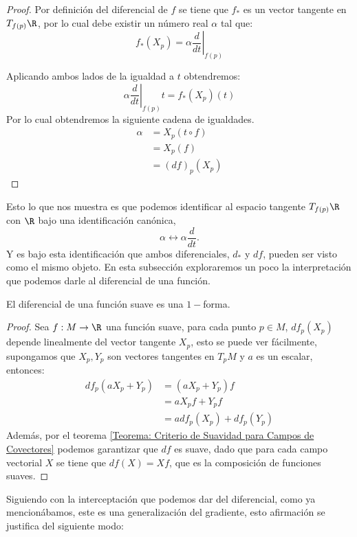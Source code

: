 \begin{proof}
	Por definición del diferencial de $f$ se tiene que $f_*$ es un vector tangente en $T_{f(p)}\R$, por lo cual debe existir un número real $\alpha$ tal que:
	\[
		f_*(X_p) = \alpha \left. \frac{d}{dt} \right|_{f(p)}
	\]

	Aplicando ambos lados de la igualdad a $t$ obtendremos:
	\[
		\alpha \left. \frac{d}{dt} \right|_{f(p)}t = f_*(X_p)(t)
	\]
	Por lo cual obtendremos la siguiente cadena de igualdades.
	\begin{align*}
		\alpha & = X_p(t \circ f) \\
		       & = X_p(f)         \\
		       & = (df)_p(X_p)
	\end{align*}
\end{proof}

Esto lo que nos muestra es que podemos identificar al espacio tangente $T_{f(p)}\R$ con $\R$ bajo una identificación canónica,
\[
	\alpha \longleftrightarrow \alpha \frac{d}{dt}.
\]
Y es bajo esta identificación que ambos diferenciales, $d_*$ y $df$, pueden ser visto como el mismo objeto. En esta subsección exploraremos un poco la interpretación que podemos darle al diferencial de una función.

\begin{lemma}
	El diferencial de una función suave es una $1-$forma.
\end{lemma}

\begin{proof}
	Sea $f: M \to \R$ una función suave, para cada punto $p \in M$, $df_p(X_p)$ depende linealmente del vector tangente $X_p$, esto se puede ver fácilmente, supongamos que $X_p, Y_p$ son vectores tangentes en $T_pM$ y $a$ es un escalar, entonces:
	\begin{align*}
		df_p( aX_p + Y_p) & = (a X_p + Y_p) f         \\
		                  & = a X_p f + Y_p f         \\
		                  & = a df_p(X_p) + df_p(Y_p)
	\end{align*}
	Además, por el teorema \ref{Teorema: Criterio de Suavidad para Campos de Covectores} podemos garantizar que $df$ es suave, dado que para cada campo vectorial $X$ se tiene que $df(X) = Xf$, que es la composición de funciones suaves.
\end{proof}

Siguiendo con la interceptación que podemos dar del diferencial, como ya mencionábamos, este es una generalización del gradiente, esto afirmación se justifica del siguiente modo:


